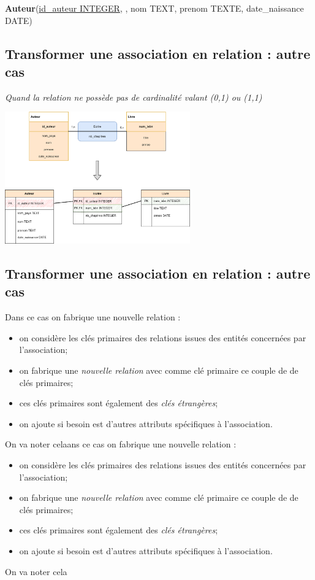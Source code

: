 \textbf{Auteur}(\uline{id\_auteur INTEGER},  , nom TEXT, prenom TEXTE, date\_naissance DATE)


\subsection{Transformer une association en relation : autre cas}
\textit{Quand la relation ne possède pas de cardinalité valant (0,1) ou (1,1)}
\begin{center}
	\includegraphics[width=8cm]{img/association_vers_relation_2}
\end{center}


\subsection{Transformer une association en relation : autre cas}
Dans ce cas on fabrique une nouvelle relation :
\begin{itemize}
	\item on considère les clés primaires des relations issues des entités concernées par l'association;
	\item on fabrique une \textit{nouvelle relation} avec comme clé primaire ce couple de de clés primaires;
	\item ces clés primaires sont également des \textit{clés étrangères};
	\item on ajoute si besoin est d'autres attributs spécifiques à l'association.
\end{itemize}
On va noter celaans ce cas on fabrique une nouvelle relation :
\begin{itemize}
	\item on considère les clés primaires des relations issues des entités concernées par l'association;
	\item on fabrique une \textit{nouvelle relation} avec comme clé primaire ce couple de de clés primaires;
	\item ces clés primaires sont également des \textit{clés étrangères};
	\item on ajoute si besoin est d'autres attributs spécifiques à l'association.
\end{itemize}
On va noter cela\\

